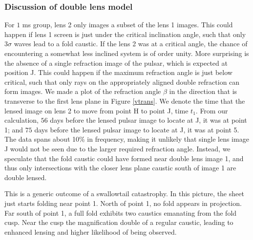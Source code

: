 \documentclass[useAMS,usenatbib]{mn2e}
\begin{document}

\subsubsection{Discussion of double lens model}
For $1$ ms group, lens 2
only images a subset of the lens 1 images.  This could happen if
lens 1 screen is just under the critical inclination
angle, such that only $3\sigma$ waves lead to a fold caustic.  If the lens 2 was at a critical angle, the chance of encountering a
somewhat less inclined system is of order unity.
More surprising is the absence of a single refraction
image of the pulsar, which is expected at position J.  This could
happen if the maximum refraction angle is just below critical, such
that only rays on the appropriately aligned double refraction can form
images.  
We made a plot of the refraction angle $\beta$ in the
direction that is transverse to the first lens plane in Figure
\ref{vtrans}. We denote the time that the lensed image on lens 2 to move from point H to point J, time $t_1$. From our calculation, $56$ days before the lensed pulsar
 image to locate at J, it was at point 1; and $75$ days before the lensed pulsar image to locate at J, it was at point 5.  The data
spans about 10\% in frequency, making it unlikely that single lens
image J would not be seen due to the larger required refraction
angle.  Instead, we speculate that the fold caustic could have formed
near double lens image 1, and thus only intersections with the closer
lens plane caustic south of image 1 are double lensed.

This is a generic outcome of a swallowtail
catastrophy\citep{Arnold1990}.   In this picture, the sheet just
starts folding near point 1.  North of point 1, no fold appears in
projection.  Far south of point 1, a full fold exhibits two caustics
emanating from the fold cusp.  Near the cusp the magnification double
of a regular caustic, leading to enhanced lensing and higher
likelihood of being observed.
\end{document}
